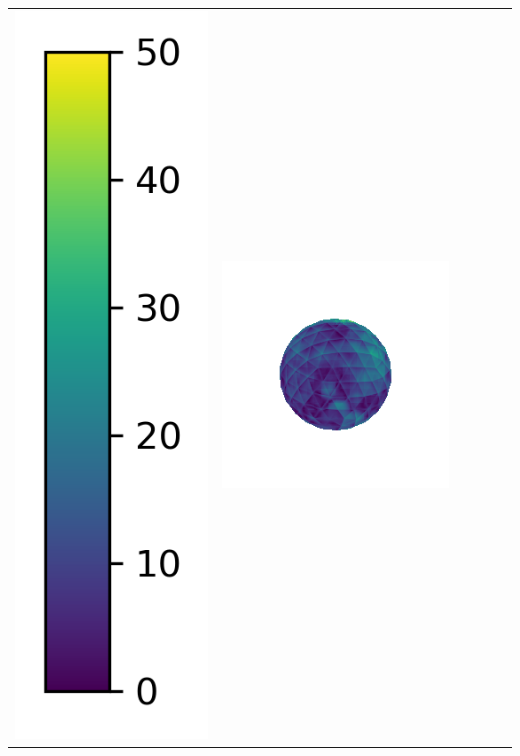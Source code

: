 \begin{tabularx}{\linewidth}{@{}Y@{}Y@{}Y@{}Y@{}Y@{}Y@{}}
\includegraphics[width=0.2\linewidth]{semisynthetic/colorbar_error_vertical.png} &
\includegraphics[width=\linewidth]{semisynthetic/20150514_1_ours_err.png} &

\end{tabularx}
